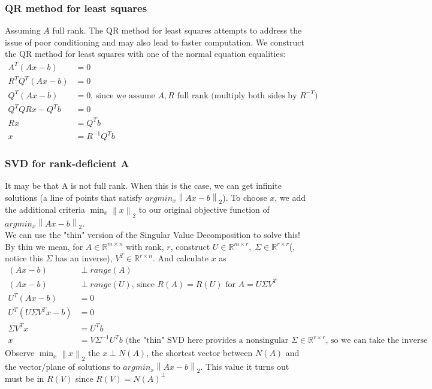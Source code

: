 \documentclass{article}
\newcommand{\norm}[2]{\left\lVert#1\right\rVert_#2}
\begin{document}
\subsubsection{QR method for least squares}
Assuming $A$ full rank. The QR method for least squares attempts to address the issue of poor conditioning and may also lead to faster computation. We construct the QR method for least squares with one of the normal equation equalities:
\begin{align*}
    A^T(Ax-b) &= 0\\
    R^TQ^T(Ax-b) &= 0\\
    Q^T(Ax-b) &= 0 \textrm{, since we assume $A, R$ full rank (multiply both sides by $R^{-T}$})\\
    Q^TQRx-Q^Tb &= 0 \\
    Rx &= Q^Tb \\
    x &= R^{-1}Q^Tb
\end{align*}

\subsubsection{SVD for rank-deficient A}
It may be that A is not full rank. When this is the case, we can get infinite solutions (a line of points that satisfy $argmin_x\norm{Ax - b}{2}$). To choose $x$, we add the additional criteria $\min_x \norm{x}{2}$ to our original objective function of $argmin_x\norm{Ax - b}{2}$.\\

We can use the "thin" version of the Singular Value Decomposition to solve this! By thin we mean, for $A \in \mathbb{R}^{m \times n}$ with rank, $r$, construct $U \in \mathbb{R}^{m \times r}, \; \Sigma \in \mathbb{R}^{r \times r}$(, notice this $\Sigma$ has an inverse), $V^T \in \mathbb{R}^{r \times n}$. And calculate $x$ as
\begin{align*}
    (Ax-b) &\perp range(A)\\
    (Ax-b) &\perp range(U) \textrm{, since $R(A) = R(U)$ for $A=U\Sigma V^T$}\\
    U^T(Ax-b) &= 0\\
    U^T(U\Sigma V^Tx - b) &= 0\\
    \Sigma V^Tx &= U^Tb\\ 
    x &= V\Sigma^{-1}U^Tb \textrm{ (the "thin" SVD here provides a nonsingular $\Sigma\in \mathbb{R}^{r \times r}$, so we can take the inverse}
\end{align*}
Observe $\min_x \norm{x}{2}$ the $x \perp N(A)$, the shortest vector between $N(A)$ and the vector/plane of solutions to $argmin_x\norm{Ax - b}{2}$. This value it turns out must be in $R(V)$ since $R(V) = N(A)^\perp$
\end{document}
